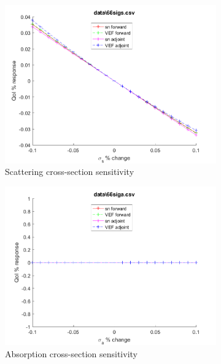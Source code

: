 \documentclass{article}
\begin{document}
\begin{figure}[H]
\begin{subfigure}{.5\textwidth}
  \includegraphics[width=.98\linewidth]{IanProposal/figures2/66sigsSens.png}
  \caption{Scattering cross-section sensitivity}
  \label{fig:sfig2}
\end{subfigure}%
\begin{subfigure}{.5\textwidth}
  \centering
  \includegraphics[width=.98\linewidth]{IanProposal/figures2/66sigaSens.png}
  \caption{Absorption cross-section sensitivity}
  \label{fig:sfig5}
\end{subfigure}%
\caption{}
\label{fig:fig}
\end{figure}
\newpage


\end{document}
